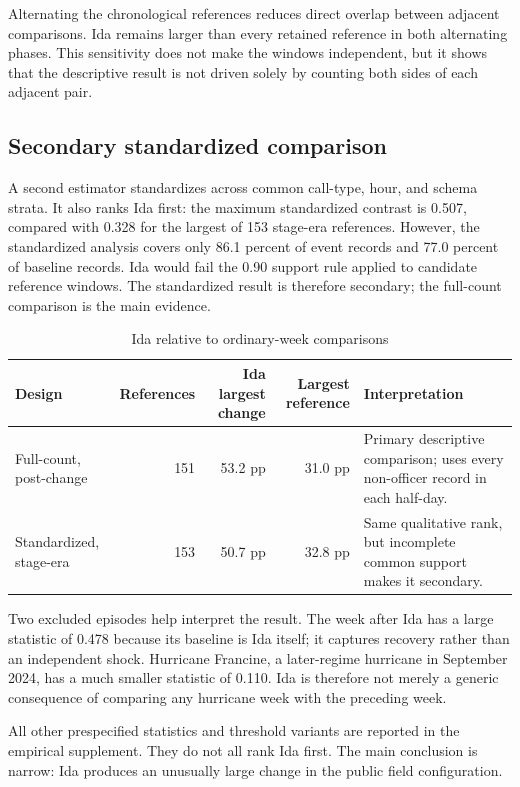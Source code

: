 \documentclass[11pt]{article}
\begin{document}
Alternating the chronological references reduces direct overlap between adjacent comparisons. Ida remains larger than every retained reference in both alternating phases. This sensitivity does not make the windows independent, but it shows that the descriptive result is not driven solely by counting both sides of each adjacent pair.

\subsection{Secondary standardized comparison}

A second estimator standardizes across common call-type, hour, and schema strata. It also ranks Ida first: the maximum standardized contrast is 0.507, compared with 0.328 for the largest of 153 stage-era references. However, the standardized analysis covers only 86.1 percent of event records and 77.0 percent of baseline records. Ida would fail the 0.90 support rule applied to candidate reference windows. The standardized result is therefore secondary; the full-count comparison is the main evidence.

\begin{table}[t]
\centering
\caption{Ida relative to ordinary-week comparisons}
\label{tab:comparison}
\begin{tabularx}{\textwidth}{@{}lrrrX@{}}
\toprule
Design & References & Ida largest change & Largest reference & Interpretation \\
\midrule
Full-count, post-change & 151 & 53.2 pp & 31.0 pp &
Primary descriptive comparison; uses every non-officer record in each half-day. \\
Standardized, stage-era & 153 & 50.7 pp & 32.8 pp &
Same qualitative rank, but incomplete common support makes it secondary. \\
\bottomrule
\end{tabularx}
\end{table}

Two excluded episodes help interpret the result. The week after Ida has a large statistic of 0.478 because its baseline is Ida itself; it captures recovery rather than an independent shock. Hurricane Francine, a later-regime hurricane in September 2024, has a much smaller statistic of 0.110. Ida is therefore not merely a generic consequence of comparing any hurricane week with the preceding week.

All other prespecified statistics and threshold variants are reported in the empirical supplement. They do not all rank Ida first. The main conclusion is narrow: Ida produces an unusually large change in the public field configuration.
\end{document}
